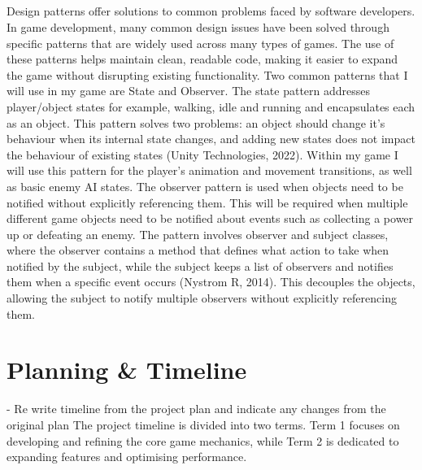 \documentclass[]{final_report}
\begin{document}
\paragraph{}
Design patterns offer solutions to common problems faced by software developers. In game development, many common design issues have been solved through specific patterns that are widely used across many types of games. The use of these patterns helps maintain clean, readable code, making it easier to expand the game without disrupting existing functionality. Two common patterns that I will use in my game are State and Observer. The state pattern addresses player/object states for example, walking, idle and running and encapsulates each as an object. This pattern solves two problems: an object should change it’s behaviour when its internal state changes, and adding new states does not impact the behaviour of existing states (Unity Technologies, 2022). Within my game I will use this pattern for the player’s animation and movement transitions, as well as basic enemy AI states. The observer pattern is used when objects need to be notified without explicitly referencing them. This will be required when multiple different game objects need to be notified about events such as collecting a power up or defeating an enemy. The pattern involves observer and subject classes, where the observer contains a method that defines what action to take when notified by the subject, while the subject keeps a list of observers and notifies them when a specific event occurs (Nystrom R, 2014). This decouples the objects, allowing the subject to notify multiple observers without explicitly referencing them. 

\chapter{Planning \& Timeline}
- Re write timeline from the project plan and indicate any changes from the original plan
The project timeline is divided into two terms. Term 1 focuses on developing and refining the core game mechanics, while Term 2 is dedicated to expanding features and optimising performance.
\end{document}
